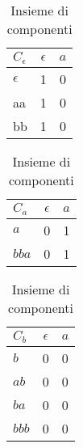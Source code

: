 \begin{table}[htp]
\centering 
\begin{tabular}{|l|c|c|} 
\hline
$C_{\epsilon}$ & $\epsilon$ & $a$  \\
 \hline  
$\epsilon$  &  1 & 0 \\
\hline 
aa  &  1 & 0 \\
bb  &  1 & 0 \\
\hline
\end{tabular}
\quad
\begin{tabular}{|l|c|c|} 
\hline
$C_{a}$ & $\epsilon$ & $a$  \\
\hline
$a$ & 0 & 1  \\
 \hline  
$bba$  &  0 & 1 \\
\hline
\end{tabular}
\quad
\begin{tabular}{|l|c|c|} 
\hline
$C_{b}$ & $\epsilon$ & $a$  \\
\hline
$b$ & 0 & 0  \\
 \hline  
$ab$  &  0 & 0 \\
$ba$  &  0 & 0 \\
$bbb$  &  0 & 0 \\
\hline
 \end{tabular}
 \caption[Insieme di componenti]{Insieme di componenti}
\label{tab:com}
\end{table}  
 
